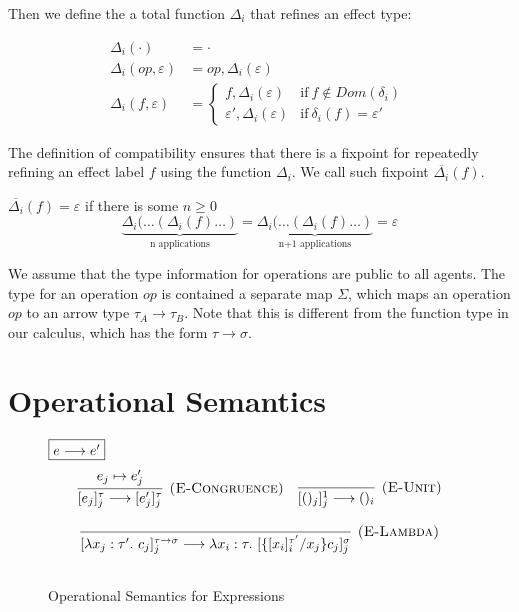 Then we define the a total function $\Delta_i$ that refines an effect type:
\begin{definition}
\begin{align*}
\Delta_i(\cdot) &= \cdot \\
\Delta_i(op, \varepsilon) &= op, \Delta_i(\varepsilon) \\
\Delta_i(f, \varepsilon) &= 
    \begin{cases}
      f, \Delta_i(\varepsilon) & \text{if}\ f \not\in Dom(\delta_i)  \ \\
      \varepsilon', \Delta_i(\varepsilon) & \text{if}\ \delta_i(f) = \varepsilon'
    \end{cases}
\end{align*}
\end{definition}

The definition of compatibility ensures that there is a fixpoint for repeatedly refining an effect label $f$ using the function $\Delta_i$. We call such fixpoint $\overline{\Delta_i}(f)$.

\begin{definition}
$\overline{\Delta_i}(f) = \varepsilon$ if there is some $n \geq 0$
\[
    \underbrace{\Delta_i(\dots (\Delta_i(f) \dots )}_\text{n applications}   = 
    \underbrace{\Delta_i(\dots (\Delta_i(f) \dots )}_\text{n+1 applications}   = \varepsilon
 \]
 \end{definition}
 
 We assume that the type information for operations are public to all agents. The type  for an operation $op$ is contained a separate map $\Sigma$, which maps an operation $op$ to an arrow type $\tau_A \rightarrow \tau_B$. Note that this is different from the function type in our calculus, which has the form $\tau \rightarrow \sigma$.




\section{Operational Semantics}
\begin{figure}[t]
\footnotesize{


$\fbox{$e \longrightarrow e'$}$
\[
\begin{array}{c}
\infer[\textsc{(E-Congruence)}]
  {[e_j]^\tau_j \longrightarrow [e_j']^\tau_j}
  {e_j \mapsto e_j'} \quad 

\infer[\textsc{(E-Unit)}]
  {[()_j]^{1}_j \longrightarrow ()_i}
  {} \\[3ex]
  
\infer[\textsc{(E-Lambda)}]
  {[\lambda x_j : \tau'.\ c_j]^{\tau \rightarrow \sigma}_{j} \longrightarrow \lambda x_i : \tau.\ [\{[x_i]^{\tau'}_{i}/x_j\}c_j]^\sigma_{j}}
  {} \\[3ex]
\end{array}
\]
}
\caption{Operational Semantics for Expressions}
\label{fig-op1}

\end{figure}


